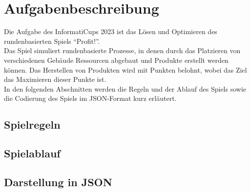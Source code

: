 \section{Aufgabenbeschreibung}
Die Aufgabe des InformatiCups 2023 ist das Lösen und Optimieren des rundenbasierten Spiels “Profit!”. 
\\
Das Spiel simuliert rundenbasierte Prozesse, in denen durch das Platzieren von verschiedenen Gebäude Ressourcen abgebaut und Produkte erstellt werden können. Das Herstellen von Produkten wird mit Punkten belohnt, wobei das Ziel das Maximieren dieser Punkte ist.
\\
In den folgenden Abschnitten werden die Regeln und der Ablauf des Spiels sowie die Codierung des Spiels im JSON-Format kurz erläutert.

\subsection{Spielregeln}

\subsection{Spielablauf}

\subsection{Darstellung in JSON}